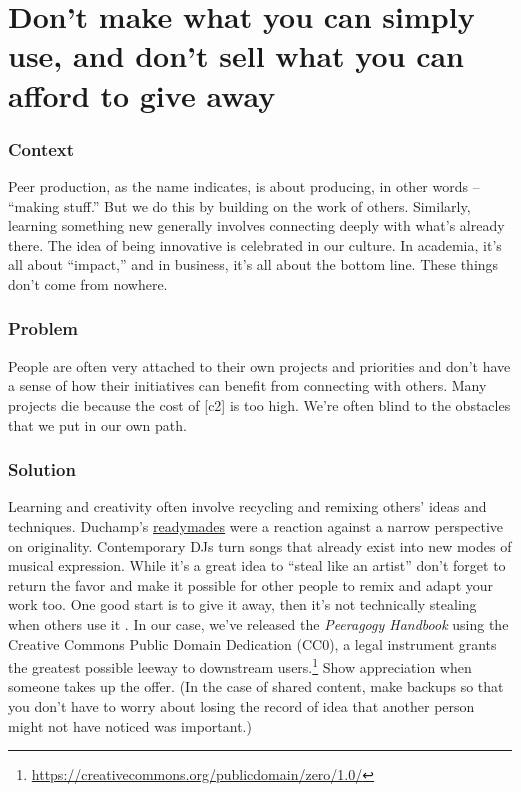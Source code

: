 \begingroup \color{BurntOrange}

\section{Don't make what you can simply use, and don't sell what you can afford to give away} \label{sec:Use_or_make}

\subsubsection*{Context}
Peer production, as the name indicates, is about producing, in other words -- ``making stuff.'' But we do this by building on the work of others.  Similarly, learning something new generally involves connecting deeply with what's already there.  The idea of being innovative is celebrated in our culture.  In academia, it's all about ``impact,'' and in business, it's all about the bottom line.  These things don't come from nowhere. 

\subsubsection*{Problem}
People are often very attached to their own projects and priorities and don't have a sense of how their initiatives can benefit from connecting with others. Many projects die because the cost of  [c2] is too high.  We're often blind to the obstacles that we put in our own path.

\subsubsection*{Solution} Learning and creativity often involve recycling and remixing others' ideas and techniques.   Duchamp's {\href{https://en.wikipedia.org/w/index.php?title=Readymades_of_Marcel_Duchamp&oldid=660437742}{readymades}} were a reaction against a narrow perspective on originality.  Contemporary DJs turn songs that already exist into new modes of musical expression.  While it's a great idea to ``steal like an artist'' don't forget to return the favor and make it possible for other people to remix and adapt your work too.  One good start is to give it away, then it's not technically stealing when others use it \cite{anderson2009free}. In our case, we've released the \emph{Peeragogy Handbook} using the Creative Commons Public Domain Dedication (CC0), a legal instrument grants the greatest possible leeway to downstream users.\footnote{\url{https://creativecommons.org/publicdomain/zero/1.0/}}  Show appreciation when someone takes up the offer.  (In the case of shared content, make backups so that you don't have to worry about losing the record of idea that another person might not have noticed was important.)

